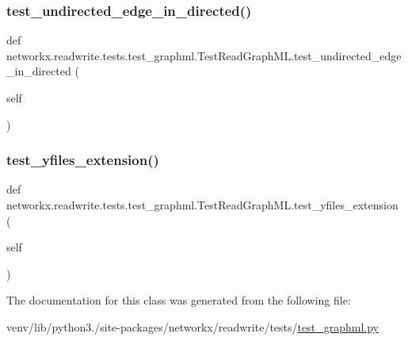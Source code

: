 \subsubsection{\texorpdfstring{test\+\_\+undirected\+\_\+edge\+\_\+in\+\_\+directed()}{test\_undirected\_edge\_in\_directed()}}
{\footnotesize\ttfamily def networkx.\+readwrite.\+tests.\+test\+\_\+graphml.\+Test\+Read\+Graph\+M\+L.\+test\+\_\+undirected\+\_\+edge\+\_\+in\+\_\+directed (\begin{DoxyParamCaption}\item[{}]{self }\end{DoxyParamCaption})}

\mbox{\label{classnetworkx_1_1readwrite_1_1tests_1_1test__graphml_1_1TestReadGraphML_abf4e2b3d695db159d554f99ae36b144d}} 
\subsubsection{\texorpdfstring{test\+\_\+yfiles\+\_\+extension()}{test\_yfiles\_extension()}}
{\footnotesize\ttfamily def networkx.\+readwrite.\+tests.\+test\+\_\+graphml.\+Test\+Read\+Graph\+M\+L.\+test\+\_\+yfiles\+\_\+extension (\begin{DoxyParamCaption}\item[{}]{self }\end{DoxyParamCaption})}



The documentation for this class was generated from the following file\+:\begin{DoxyCompactItemize}
\item 
venv/lib/python3./site-\/packages/networkx/readwrite/tests/\hyperlink{test__graphml_8py}{test\+\_\+graphml.\+py}\end{DoxyCompactItemize}
